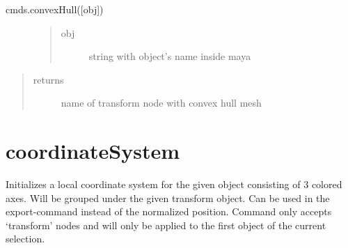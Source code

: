 \documentclass[letterpaper,10pt,english]{sphinxmanual}
\begin{document}
 cmds.convexHull({[}obj{]})
\begin{description}
\item[{}] \leavevmode\begin{quote}\begin{description}
\item[{obj}] \leavevmode
string with object’s name inside maya

\end{description}\end{quote}

\end{description}
\begin{quote}\begin{description}
\item[{returns}] \leavevmode
name of transform node with convex hull mesh

\end{description}\end{quote}
\begin{description}
\item[{}] \leavevmode
\begin{sphinxVerbatim}[commandchars=\\\{\}]
\end{sphinxVerbatim}

\end{description}


\section{coordinateSystem}
\label{\detokenize{pk_src.coordinateSystem::doc}}\label{\detokenize{pk_src.coordinateSystem:coordinatesystem}}\label{\detokenize{pk_src.coordinateSystem:id1}}
{\hyperref[\detokenize{index:commands}]{}}
\label{\detokenize{pk_src.coordinateSystem:module-pk_src.coordinateSystem}}
Initializes a local coordinate system for the given object consisting of 3 colored axes. Will be grouped under the given transform object. Can be used in the export-command instead of the normalized position.
Command only accepts ‘transform’ nodes and will only be applied to the first object of the current selection.
\end{document}
